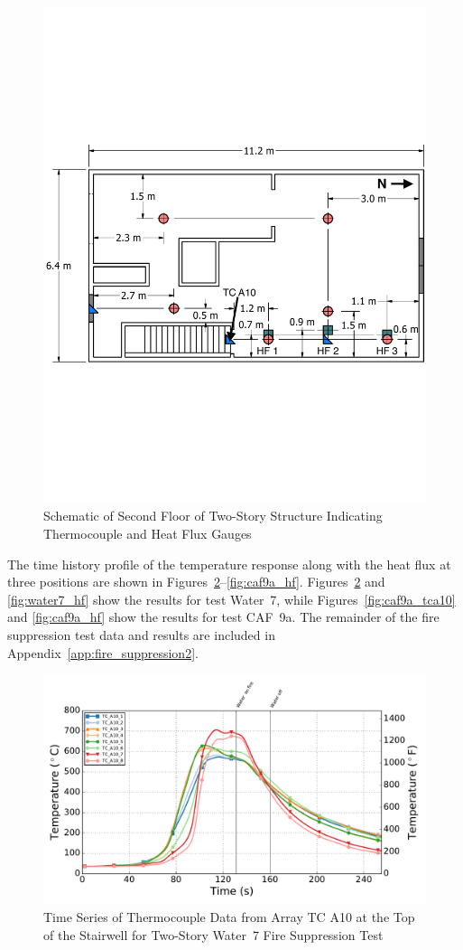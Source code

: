 \documentclass[12pt,oneside]{book}
\begin{document}
\begin{figure}[!ht]
	\includegraphics[width=.9\columnwidth]{../../DelCo_2014_2015/Drawings/PDFs/CAFS/West_Structure_2nd_Floor_Instrumentation2}
	\caption{Schematic of Second Floor of Two-Story Structure Indicating Thermocouple and Heat Flux Gauges}
	\label{fig:tcs_hf_second_2story}
\end{figure}

The time history profile of the temperature response along with the heat flux at three positions are shown in Figures~\ref{fig:water7_tca10}--\ref{fig:caf9a_hf}. Figures~\ref{fig:water7_tca10} and \ref{fig:water7_hf} show the results for test Water~7, while Figures~\ref{fig:caf9a_tca10} and \ref{fig:caf9a_hf} show the results for test CAF~9a. The remainder of the fire suppression test data and results are included in Appendix~\ref{app:fire_suppression2}.

\begin{figure}[!ht]
	\includegraphics[width=.85\columnwidth]{../Figures/Script_Figures/Test_39_West_061315_TC_A10}
	\caption{Time Series of Thermocouple Data from Array TC A10 at the Top of the Stairwell for Two-Story Water~7 Fire Suppression Test}
	\label{fig:water7_tca10}
\end{figure}
\end{document}
